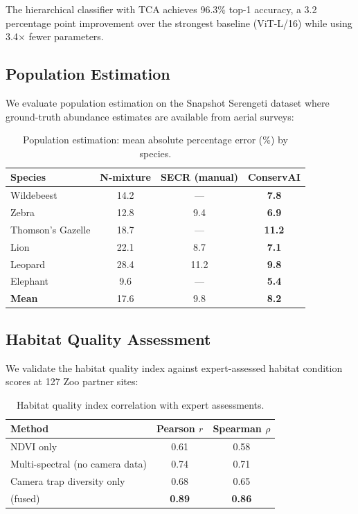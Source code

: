 The hierarchical classifier with TCA achieves 96.3\% top-1 accuracy, a 3.2 percentage point improvement over the strongest baseline (ViT-L/16) while using 3.4$\times$ fewer parameters.

\subsection{Population Estimation}

We evaluate population estimation on the Snapshot Serengeti dataset where ground-truth abundance estimates are available from aerial surveys:

\begin{table}[htbp]
\centering
\caption{Population estimation: mean absolute percentage error (\%) by species.}
\label{tab:population}
\begin{tabular}{lccc}
\toprule
\textbf{Species} & \textbf{N-mixture} & \textbf{SECR (manual)} & \textbf{ConservAI} \\
\midrule
Wildebeest & 14.2 & --- & \textbf{7.8} \\
Zebra & 12.8 & 9.4 & \textbf{6.9} \\
Thomson's Gazelle & 18.7 & --- & \textbf{11.2} \\
Lion & 22.1 & 8.7 & \textbf{7.1} \\
Leopard & 28.4 & 11.2 & \textbf{9.8} \\
Elephant & 9.6 & --- & \textbf{5.4} \\
\midrule
\textbf{Mean} & 17.6 & 9.8 & \textbf{8.2} \\
\bottomrule
\end{tabular}
\end{table}

\subsection{Habitat Quality Assessment}

We validate the habitat quality index against expert-assessed habitat condition scores at 127 Zoo partner sites:

\begin{table}[htbp]
\centering
\caption{Habitat quality index correlation with expert assessments.}
\label{tab:habitat}
\begin{tabular}{lcc}
\toprule
\textbf{Method} & \textbf{Pearson $r$} & \textbf{Spearman $\rho$} \\
\midrule
NDVI only & 0.61 & 0.58 \\
Multi-spectral (no camera data) & 0.74 & 0.71 \\
Camera trap diversity only & 0.68 & 0.65 \\
\ConservAI{} (fused) & \textbf{0.89} & \textbf{0.86} \\
\bottomrule
\end{tabular}
\end{table}

